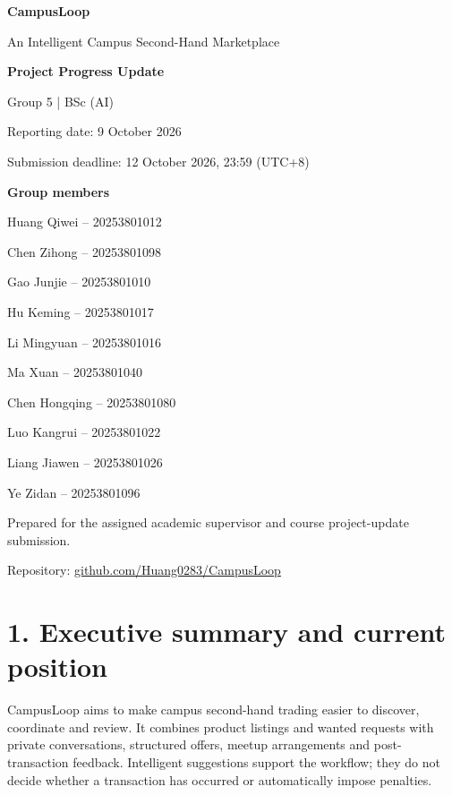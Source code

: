 \documentclass[12pt,a4paper]{article}
\begin{document}
\begin{titlepage}
\centering
\vspace*{0.6cm}
{\LARGE\bfseries CampusLoop\par}
\vspace{0.25cm}
{\large An Intelligent Campus Second-Hand Marketplace\par}
\vspace{0.6cm}
{\Large\bfseries Project Progress Update\par}
\vspace{0.35cm}
Group 5 \quad | \quad BSc (AI)\par
Reporting date: 9 October 2026\par
Submission deadline: 12 October 2026, 23:59 (UTC+8)\par
\vspace{0.4cm}
\textbf{Group members}\par
Huang Qiwei -- 20253801012\par
Chen Zihong -- 20253801098\par
Gao Junjie -- 20253801010\par
Hu Keming -- 20253801017\par
Li Mingyuan -- 20253801016\par
Ma Xuan -- 20253801040\par
Chen Hongqing -- 20253801080\par
Luo Kangrui -- 20253801022\par
Liang Jiawen -- 20253801026\par
Ye Zidan -- 20253801096\par
\vfill
Prepared for the assigned academic supervisor and course project-update submission.\par
Repository: \href{https://github.com/Huang0283/CampusLoop}{github.com/Huang0283/CampusLoop}\par
\end{titlepage}
\setcounter{page}{1}

\section*{1. Executive summary and current position}
CampusLoop aims to make campus second-hand trading easier to discover, coordinate and review. It combines product listings and wanted requests with private conversations, structured offers, meetup arrangements and post-transaction feedback. Intelligent suggestions support the workflow; they do not decide whether a transaction has occurred or automatically impose penalties.
\end{document}
